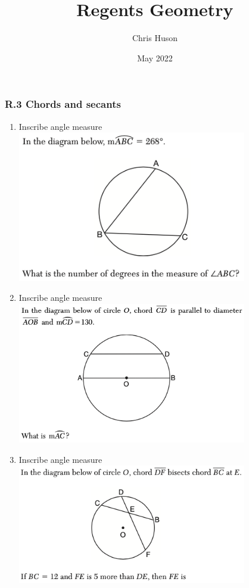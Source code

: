 \documentclass[12pt, oneside]{article}
\title{Regents Geometry}
\author{Chris Huson}
\date{May 2022}
\begin{document}
\subsubsection*{R.3 Chords and secants}
\begin{enumerate}[itemsep=1.2cm]
\item Inscribe angle measure\\
\includegraphics[width=10cm]{R-2images/R-2chordsA.png}
\vspace{1cm}

\item Inscribe angle measure\\
\includegraphics[width=10cm]{R-2images/R-2chordsB.png}
\vspace{1cm}

\item Inscribe angle measure\\
\includegraphics[width=10cm]{R-2images/R-2chordsD.png}
\vspace{1cm}


\end{enumerate}
\end{document}
